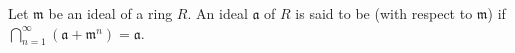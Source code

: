 Let $\mathfrak{m}$ be an ideal of a ring $R$. An ideal $\mathfrak{a}$ of $R$ is said to be  (with respect to $\mathfrak{m}$) if $\bigcap_{n=1}^{\infty} (\mathfrak{a} + \mathfrak{m}^n) = \mathfrak{a}$.
